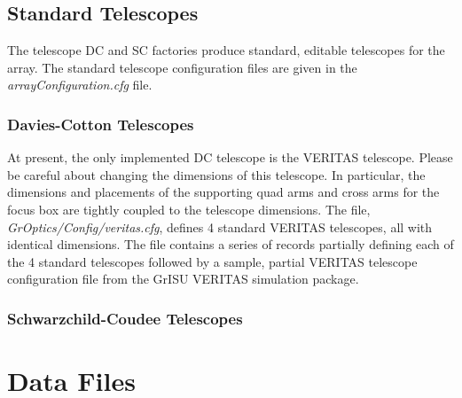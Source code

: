 \documentclass{article}
\begin{document}
\subsection{Standard Telescopes}\label{SSS:STEL1}
The telescope DC and SC factories produce standard, editable telescopes for the array.
The standard telescope configuration files are given in the \emph{arrayConfiguration.cfg} file.

\subsubsection{Davies-Cotton Telescopes}\label{SSS:DCTEL}
At present, the only implemented DC telescope is the VERITAS telescope. Please be careful about
changing the dimensions of this telescope. In particular, the dimensions and placements 
of the supporting quad arms and cross arms for the focus box are tightly coupled to the
telescope dimensions.  The file, \emph{GrOptics/Config/veritas.cfg}, defines 4 standard
VERITAS telescopes, all with identical dimensions. The file contains a series of records
partially defining each of the 4 standard telescopes followed by a sample, partial VERITAS telescope
configuration file from the GrISU VERITAS simulation package.  

 
   

\subsubsection{Schwarzchild-Coudee Telescopes}\label{SSS:SCTEL}

\section{Data Files}\label{S:DATAF}
\end{document}
